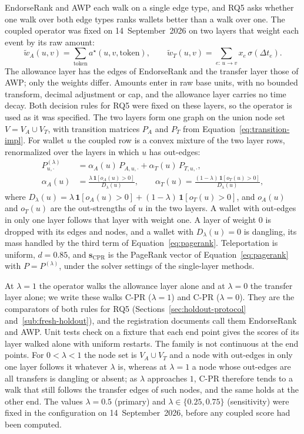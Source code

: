 EndorseRank and AWP each walk on a single edge type, and RQ5 asks whether one walk over both edge types ranks wallets better than a walk over one. The coupled operator was fixed on 14~September~2026 on two layers that weight each event by its raw amount:
\begin{equation}
\label{eq:raw-layers}
\tilde w_A(u,v)
=
\sum_{\mathrm{token}}
a^{\star}(u,v,\mathrm{token}),
\qquad
\tilde w_T(u,v)
=
\sum_{e:\,u\to v}
x_e\,\sigma(\Delta t_e).
\end{equation}
The allowance layer has the edges of EndorseRank and the transfer layer those of AWP; only the weights differ. Amounts enter in raw base units, with no bounded transform, decimal adjustment or cap, and the allowance layer carries no time decay. Both decision rules for RQ5 were fixed on these layers, so the operator is used as it was specified. The two layers form one graph on the union node set $V=V_A\cup V_T$, with transition matrices $P_A$ and $P_T$ from Equation~\eqref{eq:transition-impl}. For wallet $u$ the coupled row is a convex mixture of the two layer rows, renormalized over the layers in which $u$ has out-edges:
\begin{align}
P^{(\lambda)}_{u,\cdot}
&=
\alpha_A(u)\,P_{A,u,\cdot}+\alpha_T(u)\,P_{T,u,\cdot},
\label{eq:coupled-transition}\\
\alpha_A(u)
&=
\frac{\lambda\,\mathbf{1}[o_A(u)>0]}{D_{\lambda}(u)},
\qquad
\alpha_T(u)=\frac{(1-\lambda)\,\mathbf{1}[o_T(u)>0]}{D_{\lambda}(u)},
\nonumber
\end{align}
where $D_{\lambda}(u)=\lambda\,\mathbf{1}[o_A(u)>0]+(1-\lambda)\,\mathbf{1}[o_T(u)>0]$, and $o_A(u)$ and $o_T(u)$ are the out-strengths of $u$ in the two layers. A wallet with out-edges in only one layer follows that layer with weight one. A layer of weight $0$ is dropped with its edges and nodes, and a wallet with $D_{\lambda}(u)=0$ is dangling, its mass handled by the third term of Equation~\eqref{eq:pagerank}. Teleportation is uniform, $d=0.85$, and $\mathbf{s}_{\mathrm{CPR}}$ is the PageRank vector of Equation~\eqref{eq:pagerank} with $P=P^{(\lambda)}$, under the solver settings of the single-layer methods.

At $\lambda=1$ the operator walks the allowance layer alone and at $\lambda=0$ the transfer layer alone; we write these walks C-PR ($\lambda=1$) and C-PR ($\lambda=0$). They are the comparators of both rules for RQ5 (Sections~\ref{sec:holdout-protocol} and~\ref{sub:fresh-holdout}), and the registration documents call them EndorseRank and AWP. Unit tests check on a fixture that each end point gives the scores of its layer walked alone with uniform restarts. The family is not continuous at the end points. For $0<\lambda<1$ the node set is $V_A\cup V_T$ and a node with out-edges in only one layer follows it whatever $\lambda$ is, whereas at $\lambda=1$ a node whose out-edges are all transfers is dangling or absent; as $\lambda$ approaches $1$, C-PR therefore tends to a walk that still follows the transfer edges of such nodes, and the same holds at the other end. The values $\lambda=0.5$ (primary) and $\lambda\in\{0.25,0.75\}$ (sensitivity) were fixed in the configuration on 14~September~2026, before any coupled score had been computed.

